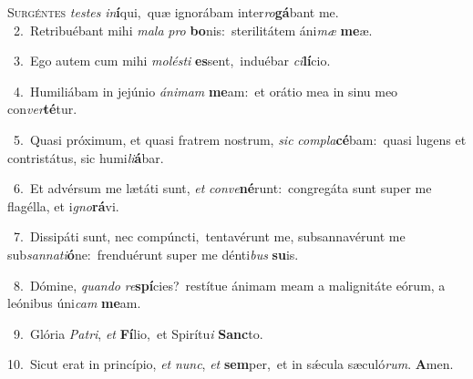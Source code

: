 \lettrine{\initial\textcolor{\initialcolor}{S}}{urgéntes} \textit{tes}\-\textit{tes} \textit{in}\-\textbf{í}qui,~\star quæ ignorábam inter\-\textit{ro}\-\textbf{gá}bant me.\\
{\numbfont\textcolor{\numbcolor}{~2.}}~Retribuébant mihi \textit{ma}\-\textit{la} \textit{pro} \textbf{bo}\-nis:~\star sterilitátem áni\textit{mæ} \textbf{me}\-æ.\par
{\numbfont\textcolor{\numbcolor}{~3.}}~Ego autem cum mihi \textit{mo}\-\textit{lés}\textit{ti} \textbf{es}\-sent,~\star induébar \textit{ci}\-\textbf{lí}cio.\par
{\numbfont\textcolor{\numbcolor}{~4.}}~Humiliábam in jejúnio \textit{á}\-\textit{ni}\textit{mam} \textbf{me}\-am:~\star et orátio mea in sinu meo con\-\textit{ver}\-\textbf{té}tur.\par
{\numbfont\textcolor{\numbcolor}{~5.}}~Quasi próximum, et quasi fratrem nostrum, \textit{sic} \textit{com}\-\textit{pla}\textbf{cé}bam:~\star quasi lugens et contristátus, sic humi\-\textit{li}\-\textbf{á}bar.\par
{\numbfont\textcolor{\numbcolor}{~6.}}~Et advérsum me lætáti sunt, \textit{et} \textit{con}\-\textit{ve}\textbf{né}runt:~\star congregáta sunt super me flagélla, et i\-\textit{gno}\-\textbf{rá}vi.\par
{\numbfont\textcolor{\numbcolor}{~7.}}~Dissipáti sunt, nec compúncti,~\dagger tentavérunt me, subsannavérunt me sub\-\textit{san}\-\textit{na}\textit{ti}\textbf{ó}ne:~\star frenduérunt super me dénti\textit{bus} \textbf{su}\-is.\par
{\numbfont\textcolor{\numbcolor}{~8.}}~Dómine, \textit{quan}\-\textit{do} \textit{re}\-\textbf{spí}cies?~\star restítue ánimam meam a malignitáte eórum, a leónibus úni\textit{cam} \textbf{me}\-am.\par
{\numbfont\textcolor{\numbcolor}{~9.}}~Glória \textit{Pa}\-\textit{tri}, \textit{et} \textbf{Fí}\-lio,~\star et Spirítu\textit{i} \textbf{Sanc}\-to.\par
{\numbfont\textcolor{\numbcolor}{10.}}~Sicut erat in princípio, \textit{et} \textit{nunc}\-, \textit{et} \textbf{sem}\-per,~\star et in sǽcula sæculó\-\textit{rum}\-. \textbf{A}\-men.\par
